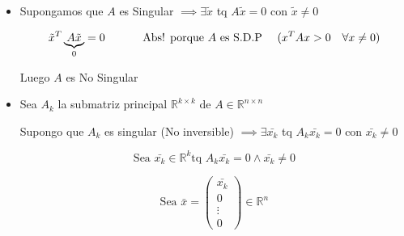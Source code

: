 \begin{itemize}

\item Supongamos que $A$ es Singular \(\implies \exists \tilde{x} \) tq \(A\tilde{x} = 0 \) con \(\tilde{x} \neq 0 \)

\begin{equation}
\tilde{x}^{T}\underbrace{A\tilde{x}}_{0} = 0 \text{\hspace{3em} Abs! porque $A$ es S.D.P \hspace{1em}} (x^{T}Ax > 0 \hspace{1em}\forall x \neq 0)
\end{equation}


Luego $A$ es No Singular

\item Sea $A_{k}$ la submatriz principal $\mathbb{R}^{k\times k}$ de $A \in \mathbb{R}^{n \times n}$

Supongo que $A_{k}$ es singular (No inversible) $\implies \exists \bar{x_k}$ tq $A_k \bar{x_k} = 0$ con $\bar{x_k} \neq 0$

\[\text{Sea } \bar{x_{k}} \in \mathbb{R}^{k} \text{tq } A_{k} \bar{x_{k}} = 0  \land \bar{x_{k}} \neq 0 \]

\[ \text{Sea } \bar{x} = \begin{pmatrix} \bar{x_{k}} \\ 0 \\ \vdots \\ 0 \end{pmatrix} \in \mathbb{R}^{n} \]


\end{itemize}

